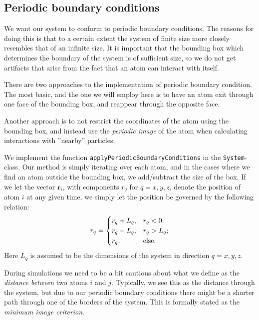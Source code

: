 \documentclass[a4paper]{article}
\renewcommand{\vec}[1]{\mathbf{#1}}
\begin{document}
\subsection{Periodic boundary conditions}
\label{sub:periodic_boundary_conditions}
        
    We want our system to conform to periodic boundary conditions. The reasons
    for doing this is that to a certain extent the system of finite size more
    closely resembles that of an infinite size. It is important that the
    bounding box which determines the boundary of the system is of sufficient
    size, so we do not get artifacts that arise from the fact that an atom can
    interact with itself. 
    
    There are two approaches to the implementation of periodic boundary
    condition. The most basic, and the one we will employ here is to have an
    atom exit through one face of the bounding box, and reappear through the
    opposite face. 

    Another approach is to not restrict the coordinates of the atom using the
    bounding box, and instead use the \emph{periodic image} of the atom when
    calculating interactions with ''nearby'' particles.
    
    We implement the function \texttt{applyPeriodicBoundaryConditions} in the
    \texttt{System}-class.  Our method is simply iterating over each atom, and
    in the cases where we find an atom outside the bounding box, we
    add/subtract the size of the box. If we let the vector $\vec{r}_i$, with
    components $r_q$ for $q = x, y, z$, denote the position of atom $i$ at any
    given time, we simply let the position be governed by the following
    relation:
    \begin{equation}
        \notag
        r_q = \begin{cases}
            r_q + L_q, & r_q < 0; \\
            r_q - L_q, & r_q > L_q; \\
            r_q, & \text{else.}
        \end{cases}
    \end{equation}
    Here $L_q$ is assumed to be the dimensions of the system in direction $q =
    x, y, z$.
    
    During simulations we need to be a bit cautious about what we define as the
    \emph{distance between} two atoms $i$ and $j$. Typically, we see this as
    the distance through the system, but due to our periodic boundary
    conditions there might be a shorter path through one of the borders of the
    system. This is formally stated as the \emph{minimum image
    criterion}\cite{min_image}.
    
\end{document}
